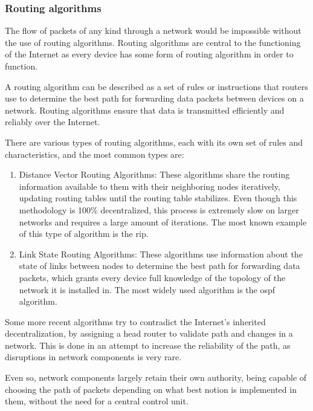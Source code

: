 \subsubsection{Routing algorithms}
\label{subsubsec:routing_alg}
The flow of packets of any kind through a network would be impossible without the use of routing algorithms. Routing algorithms are central to the functioning of the Internet as every device has some form of routing algorithm in order to function.

A routing algorithm can be described as a set of rules or instructions that routers use to determine the best path for forwarding data packets between devices on a network. Routing algorithms ensure that data is transmitted efficiently and reliably over the Internet.

There are various types of routing algorithms, each with its own set of rules and characteristics, and the most common types are:
\begin{enumerate}
	\item Distance Vector Routing Algorithms: These algorithms share the routing information available to them with their neighboring nodes iteratively, updating routing tables until the routing table stabilizes. Even though this methodology is 100\% decentralized, this process is extremely slow on larger networks and requires a large amount of iterations. The most known example of this type of algorithm is the \gls{rip}.
	\item Link State Routing Algorithms: These algorithms use information about the state of links between nodes to determine the best path for forwarding data packets, which grants  every device full knowledge of the topology of the network it is installed in. The most widely used algorithm is the \gls{ospf} algorithm.

\end{enumerate}


Some more recent algorithms try to contradict the Internet's inherited decentralization, by assigning a head router to validate path and changes in a network. This is done in an attempt to increase the reliability of the path, as disruptions in network components is very rare.

Even so, network components largely retain their own authority, being capable of choosing the path of packets depending on what best notion is implemented in them, without the need for a central control unit.

